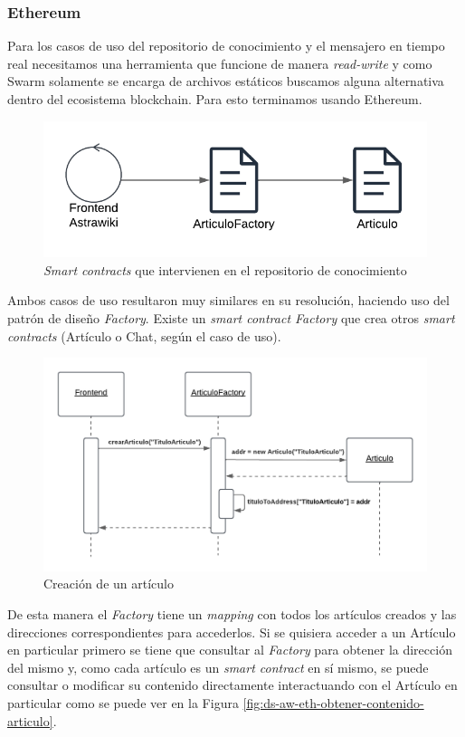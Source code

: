 \subsubsection{Ethereum}

Para los casos de uso del repositorio de conocimiento y el mensajero en tiempo real necesitamos una herramienta que funcione de manera \textit{read-write} y como Swarm solamente se encarga de archivos estáticos buscamos alguna alternativa dentro del ecosistema blockchain. Para esto terminamos usando Ethereum.

\begin{figure}[H]
    \centering
    \includegraphics[width=0.5\linewidth]{img/astrawiki-articulo-factory.png}
    \caption{\textit{Smart contracts} que intervienen en el repositorio de conocimiento}
    \label{fig:aw-eth-articulo-factory}
\end{figure}

Ambos casos de uso resultaron muy similares en su resolución, haciendo uso del patrón de diseño \textit{Factory}. Existe un \textit{smart contract Factory} que crea otros \textit{smart contracts} (Artículo o Chat, según el caso de uso).

\begin{figure}[H]
    \centering
    \includegraphics[width=0.75\linewidth]{img/ds-aw-eth-crear-articulo.png}
    \caption{Creación de un artículo}
    \label{fig:ds-aw-eth-crear-articulo}
\end{figure}

De esta manera el \textit{Factory} tiene un \textit{mapping} con todos los artículos creados y las direcciones correspondientes para accederlos. Si se quisiera acceder a un Artículo en particular primero se tiene que consultar al \textit{Factory} para obtener la dirección del mismo y, como cada artículo es un \textit{smart contract} en sí mismo, se puede consultar o modificar su contenido directamente interactuando con el Artículo en particular como se puede ver en la Figura \ref{fig:ds-aw-eth-obtener-contenido-articulo}.


